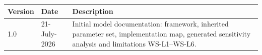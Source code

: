 \documentclass[11pt,a4paper]{article}
\begin{document}

\mkmchangelog

\begin{table}[H]
  \centering
  \begin{tabular}{lll}
    \toprule
    \textbf{Version} & \textbf{Date} & \textbf{Description} \\
    \midrule
    1.0 & 21-July-2026 & Initial model documentation: framework, inherited
    parameter set, implementation map, generated sensitivity analysis and
    limitations WS-L1--WS-L6. \\
    \bottomrule
  \end{tabular}
\end{table}
\end{document}
